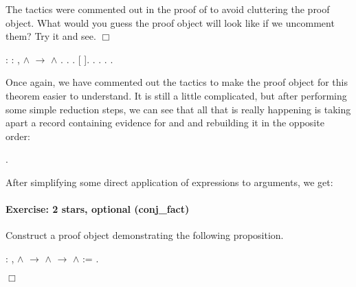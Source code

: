 \documentclass[12pt]{report}
\begin{document}
 The  tactics were commented out in the proof of
     to avoid cluttering the proof object.  What would
    you guess the proof object will look like if we uncomment them?
    Try it and see.  \ensuremath{\Box} \begin{coqdoccode}
\coqdocemptyline
\coqdocnoindent
{}  : \coqdockw{\ensuremath{\forall}}   : , \coqdoceol
\coqdocindent{1.00em}
 \ensuremath{\land}  \ensuremath{\rightarrow}  \ensuremath{\land} .\coqdoceol
\coqdocnoindent
{}.\coqdoceol
\coqdocindent{1.00em}
   .\coqdoceol
\coqdocindent{1.00em}
   [ ].\coqdoceol
\coqdocindent{1.00em}
.\coqdoceol
  .\coqdoceol
  . .\coqdoceol
\coqdocemptyline
\end{coqdoccode}
Once again, we have commented out the  tactics to make the
    proof object for this theorem easier to understand. It is still
    a little complicated, but after performing some simple reduction
    steps, we can see that all that is really happening is taking apart 
    a record containing evidence for  and  and rebuilding it in the
    opposite order: \begin{coqdoccode}
\coqdocemptyline
\coqdocnoindent
{} .\coqdoceol
\coqdocemptyline
\end{coqdoccode}
After simplifying some direct application of  expressions to arguments,
we get: \begin{coqdoccode}
\coqdocemptyline
\coqdocemptyline
\end{coqdoccode}
\paragraph{Exercise: 2 stars, optional (conj\_fact)}

 Construct a proof object demonstrating the following proposition. \begin{coqdoccode}
\coqdocemptyline
\coqdocnoindent
{}  : \coqdockw{\ensuremath{\forall}}   ,  \ensuremath{\land}  \ensuremath{\rightarrow}  \ensuremath{\land}  \ensuremath{\rightarrow}  \ensuremath{\land}  :=\coqdoceol
\coqdocindent{1.00em}
 .\coqdoceol
\end{coqdoccode}
\ensuremath{\Box} 
\end{document}
